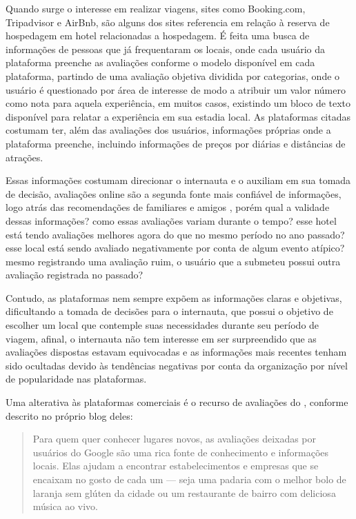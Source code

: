 Quando surge o interesse em realizar viagens, sites como Booking.com, Tripadvisor e AirBnb, são alguns dos sites referencia em relação à reserva de hospedagem em hotel  relacionadas a hospedagem. É feita uma busca de informações de pessoas que já frequentaram os locais, onde cada usuário da plataforma preenche as avaliações conforme o modelo disponível em cada plataforma, partindo de uma avaliação objetiva dividida por categorias, onde o usuário é questionado por área de interesse de modo a atribuir um valor número como nota para aquela experiência, em muitos casos, existindo um bloco de texto disponível para relatar a experiência em sua estadia local. As plataformas citadas costumam ter, além das avaliações dos usuários, informações próprias onde a plataforma preenche, incluindo informações de preços por diárias e distâncias de atrações.

Essas informações costumam direcionar o internauta e o auxiliam em sua tomada de decisão, avaliações online são a segunda fonte mais confiável de informações, logo atrás das recomendações de familiares e amigos \cite{chatterjee2020drivers}, porém qual a validade dessas informações? como essas avaliações variam durante o tempo? esse hotel está tendo avaliações melhores agora do que no mesmo período no ano passado? esse local está sendo avaliado negativamente por conta de algum evento atípico? mesmo registrando uma avaliação ruim, o usuário que a submeteu possui outra avaliação registrada no passado?

Contudo, as plataformas nem sempre expõem as informações claras e objetivas, dificultando a tomada de decisões para o internauta, que possui o objetivo de escolher um local que contemple suas necessidades durante seu período de viagem, afinal, o internauta não tem interesse em ser surpreendido que as avaliações dispostas estavam equivocadas e as informações mais recentes tenham sido ocultadas devido às tendências negativas por conta da organização por nível de popularidade nas plataformas.

Uma alterativa às plataformas comerciais é o recurso de avaliações do , conforme descrito no próprio blog deles:

\begin{quote}
    Para quem quer conhecer lugares novos, as avaliações deixadas por usuários do Google são uma rica fonte de conhecimento e informações locais. Elas ajudam a encontrar estabelecimentos e empresas que se encaixam no gosto de cada um — seja uma padaria com o melhor bolo de laranja sem glúten da cidade ou um restaurante de bairro com deliciosa música ao vivo.
\end{quote}


